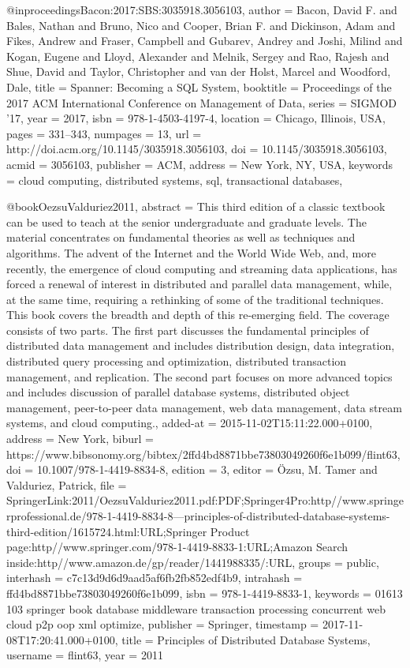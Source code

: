 @inproceedings{Bacon:2017:SBS:3035918.3056103,
  author = {Bacon, David F. and Bales, Nathan and Bruno, Nico and Cooper, Brian F. and Dickinson, Adam and Fikes, Andrew and Fraser, Campbell and Gubarev, Andrey and Joshi, Milind and Kogan, Eugene and Lloyd, Alexander and Melnik, Sergey and Rao, Rajesh and Shue, David and Taylor, Christopher and van der Holst, Marcel and Woodford, Dale},
  title = {Spanner: Becoming a SQL System},
  booktitle = {Proceedings of the 2017 ACM International Conference on Management of Data},
  series = {SIGMOD '17},
  year = {2017},
  isbn = {978-1-4503-4197-4},
  location = {Chicago, Illinois, USA},
  pages = {331--343},
  numpages = {13},
  url = {http://doi.acm.org/10.1145/3035918.3056103},
  doi = {10.1145/3035918.3056103},
  acmid = {3056103},
  publisher = {ACM},
  address = {New York, NY, USA},
  keywords = {cloud computing, distributed systems, sql, transactional databases},
}

@book{OezsuValduriez2011,
  abstract = {This third edition of a classic textbook can be used to teach at the senior undergraduate and graduate levels. The material concentrates on fundamental theories as well as techniques and algorithms. The advent of the Internet and the World Wide Web, and, more recently, the emergence of cloud computing and streaming data applications, has forced a renewal of interest in distributed and parallel data management, while, at the same time, requiring a rethinking of some of the traditional techniques. This book covers the breadth and depth of this re-emerging field. The coverage consists of two parts. The first part discusses the fundamental principles of distributed data management and includes distribution design, data integration, distributed query processing and optimization, distributed transaction management, and replication. The second part focuses on more advanced topics and includes discussion of parallel database systems, distributed object management, peer-to-peer data management, web data management, data stream systems, and cloud computing.},
  added-at = {2015-11-02T15:11:22.000+0100},
  address = {New York},
  biburl = {https://www.bibsonomy.org/bibtex/2ffd4bd8871bbe73803049260f6e1b099/flint63},
  doi = {10.1007/978-1-4419-8834-8},
  edition = 3,
  editor = {\"{O}zsu, M. Tamer and Valduriez, Patrick},
  file = {SpringerLink:2011/OezsuValduriez2011.pdf:PDF;Springer4Pro:http\://www.springerprofessional.de/978-1-4419-8834-8---principles-of-distributed-database-systems-third-edition/1615724.html:URL;Springer Product page:http\://www.springer.com/978-1-4419-8833-1:URL;Amazon Search inside:http\://www.amazon.de/gp/reader/1441988335/:URL},
  groups = {public},
  interhash = {c7c13d9d6d9aad5af6fb2fb852edf4b9},
  intrahash = {ffd4bd8871bbe73803049260f6e1b099},
  isbn = {978-1-4419-8833-1},
  keywords = {01613 103 springer book database middleware transaction processing concurrent web cloud p2p oop xml optimize},
  publisher = {Springer},
  timestamp = {2017-11-08T17:20:41.000+0100},
  title = {Principles of Distributed Database Systems},
  username = {flint63},
  year = 2011
}

